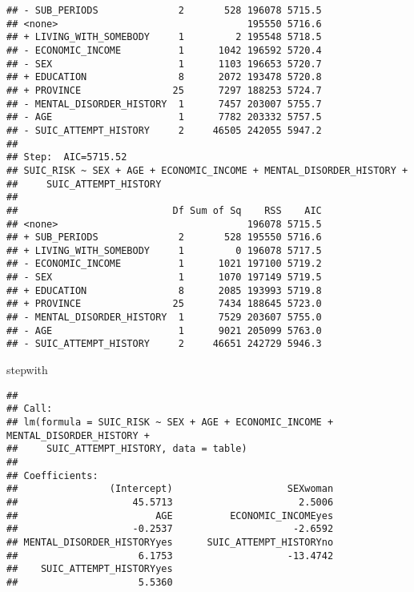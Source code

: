 \documentclass[
]{book}
\newenvironment{Shaded}{\begin{snugshade}}{\end{snugshade}}
\newcommand{\CommentTok}[1]{\textcolor[rgb]{0.56,0.35,0.01}{\textit{#1}}}
\newcommand{\NormalTok}[1]{#1}
\newcommand{\SpecialCharTok}[1]{\textcolor[rgb]{0.00,0.00,0.00}{#1}}
\begin{document}
\begin{verbatim}
## - SUB_PERIODS              2       528 196078 5715.5
## <none>                                 195550 5716.6
## + LIVING_WITH_SOMEBODY     1         2 195548 5718.5
## - ECONOMIC_INCOME          1      1042 196592 5720.4
## - SEX                      1      1103 196653 5720.7
## + EDUCATION                8      2072 193478 5720.8
## + PROVINCE                25      7297 188253 5724.7
## - MENTAL_DISORDER_HISTORY  1      7457 203007 5755.7
## - AGE                      1      7782 203332 5757.5
## - SUIC_ATTEMPT_HISTORY     2     46505 242055 5947.2
## 
## Step:  AIC=5715.52
## SUIC_RISK ~ SEX + AGE + ECONOMIC_INCOME + MENTAL_DISORDER_HISTORY + 
##     SUIC_ATTEMPT_HISTORY
## 
##                           Df Sum of Sq    RSS    AIC
## <none>                                 196078 5715.5
## + SUB_PERIODS              2       528 195550 5716.6
## + LIVING_WITH_SOMEBODY     1         0 196078 5717.5
## - ECONOMIC_INCOME          1      1021 197100 5719.2
## - SEX                      1      1070 197149 5719.5
## + EDUCATION                8      2085 193993 5719.8
## + PROVINCE                25      7434 188645 5723.0
## - MENTAL_DISORDER_HISTORY  1      7529 203607 5755.0
## - AGE                      1      9021 205099 5763.0
## - SUIC_ATTEMPT_HISTORY     2     46651 242729 5946.3
\end{verbatim}

\begin{Shaded}
\begin{Highlighting}[]
\NormalTok{stepwith}
\end{Highlighting}
\end{Shaded}

\begin{verbatim}
## 
## Call:
## lm(formula = SUIC_RISK ~ SEX + AGE + ECONOMIC_INCOME + MENTAL_DISORDER_HISTORY + 
##     SUIC_ATTEMPT_HISTORY, data = table)
## 
## Coefficients:
##                (Intercept)                    SEXwoman  
##                    45.5713                      2.5006  
##                        AGE          ECONOMIC_INCOMEyes  
##                    -0.2537                     -2.6592  
## MENTAL_DISORDER_HISTORYyes      SUIC_ATTEMPT_HISTORYno  
##                     6.1753                    -13.4742  
##    SUIC_ATTEMPT_HISTORYyes  
##                     5.5360
\end{verbatim}

\begin{Shaded}
\end{Shaded}
\end{document}
